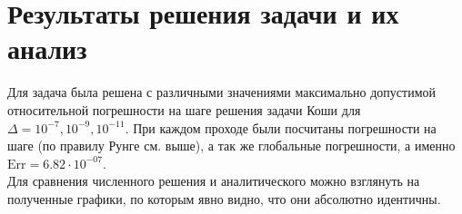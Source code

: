 \section{Результаты решения задачи и их анализ}

Для задача была решена с различными значениями максимально допустимой относительной погрешности на шаге решения задачи Коши для $\Delta = 10^{-7}, 10^{-9}, 10^{-11}.$ При каждом проходе были посчитаны погрешности на шаге (по правилу Рунге см. выше), а так же глобальные погрешности, а именно $\mathrm{Err} = 6.82\cdot 10^{-07}$.\\

Для сравнения численного решения и аналитического можно взглянуть на полученные графики, по которым явно видно, что они абсолютно идентичны.

\begin{figure}[H]
\noindent{}
\end{figure}
\begin{figure}[H]
\noindent{}
\end{figure}
